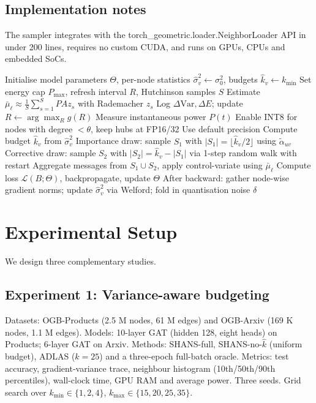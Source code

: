 \documentclass{article}
\begin{document}
\subsection{Implementation notes}
The sampler integrates with the torch\_geometric.loader.NeighborLoader API in under 200 lines, requires no custom CUDA, and runs on GPUs, CPUs and embedded SoCs.
\begin{algorithm}[t]
\caption{SHANS training with energy-aware sampling}
\begin{algorithmic}[1]
\State Initialise model parameters \(\Theta\), per-node statistics \(\hat{\sigma}_v^2\leftarrow\sigma_0^2\), budgets \(\hat{k}_v\leftarrow k_{\min}\)
\State Set energy cap \(P_{\max}\), refresh interval \(R\), Hutchinson samples \(S\)
      \State Estimate \(\bar{\mu}_\ell\approx \frac{1}{S}\sum_{s=1}^S P A z_s\) with Rademacher \(z_s\)
    \EndFor
    \State Log \(\Delta\mathrm{Var},\Delta E\); update \(R\leftarrow \arg\max_R g(R)\)
  \EndIf
    \State Measure instantaneous power \(P(t)\)
      \State Enable INT8 for nodes with degree \(<\theta\), keep hubs at FP16/32
    \Else
      \State Use default precision
    \EndIf
        \State Compute budget \(\hat{k}_v\) from \(\hat{\sigma}_v^2\)
        \State Importance draw: sample \(S_1\) with \(|S_1|=\lfloor \hat{k}_v/2\rfloor\) using \(\tilde{\alpha}_{uv}\)
        \State Corrective draw: sample \(S_2\) with \(|S_2|=\hat{k}_v-|S_1|\) via 1-step random walk with restart
        \State Aggregate messages from \(S_1\cup S_2\), apply control-variate using \(\bar{\mu}_\ell\)
      \EndFor
    \EndFor
    \State Compute loss \(\mathcal{L}(B;\Theta)\), backpropagate, update \(\Theta\)
    \State After backward: gather node-wise gradient norms; update \(\hat{\sigma}_v^2\) via Welford; fold in quantisation noise \(\delta\)
  \EndFor
\EndFor
\end{algorithmic}
\end{algorithm}

\section{Experimental Setup}
We design three complementary studies.
\subsection{Experiment 1: Variance-aware budgeting}
Datasets: OGB-Products (2.5 M nodes, 61 M edges) and OGB-Arxiv (169 K nodes, 1.1 M edges). Models: 10-layer GAT (hidden 128, eight heads) on Products; 6-layer GAT on Arxiv. Methods: SHANS-full, SHANS-no-\(\hat{k}\) (uniform budget), ADLAS (\(k=25\)) and a three-epoch full-batch oracle. Metrics: test accuracy, gradient-variance trace, neighbour histogram (10th/50th/90th percentiles), wall-clock time, GPU RAM and average power. Three seeds. Grid search over \(k_{\min}\in\{1,2,4\}\), \(k_{\max}\in\{15,20,25,35\}\).
\end{document}
